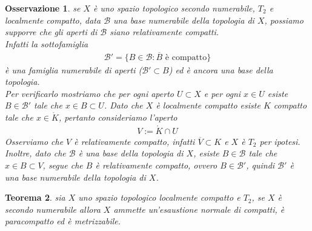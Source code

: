 \documentclass[oneside, 11pt]{amsbook}
\newcommand{\B}{\mathcal{B}}
\newcommand{\0}{{(0)}}
\newcommand{\3}{{(3)}}
\theoremstyle{colonplain}
\newtheorem{thm}{Teorema}[chapter]
\theoremstyle{colondefinition}
\theoremstyle{colonremark}
\newtheorem{rmk}[thm]{Osservazione}
\numberwithin{equation}{chapter}
\begin{document}
\begin{rmk}\label{RelCptBase}
    se $X$ è uno spazio topologico secondo numerabile, $T_2$ e localmente compatto, data $\B$ una base numerabile della topologia di $X$, possiamo supporre che gli aperti di $\B$ siano relativamente compatti. \\
    Infatti la sottofamiglia
    \begin{align}
        \B' = \{B \in \B : \overline{B} \text{ è compatto}\}
    \end{align}
    è una famiglia numerabile di aperti ($\B' \subset B$) ed è ancora una base della topologia. \\
    Per verificarlo mostriamo che per ogni aperto $U \subset X$ e per ogni $x \in U$ esiste $B \in \B'$ tale che $x \in B \subset U$. Dato che $X$ è localmente compatto esiste $K$ compatto tale che $x \in \mathring{K}$, pertanto consideriamo l'aperto
    \begin{align}
        V := \mathring{K} \cap U
    \end{align}
    Osserviamo che $V$ è relativamente compatto, infatti $\overline{V} \subset K$ e $X$ è $T_2$ per ipotesi. Inoltre, dato che $\B$ è una base della topologia di $X$, esiste $B \in \B$ tale che $x \in B \subset V$, segue che $B$ è relativamente compatto, ovvero $B \in \B'$, quindi $\B'$ è una base numerabile della topologia di $X$.
\end{rmk}
\begin{thm}\label{SecNumConsVTop}
    sia $X$ uno spazio topologico localmente compatto e $T_2$, se $X$ è secondo numerabile allora $X$ ammette un'esaustione normale di compatti, è paracompatto ed è metrizzabile.
\end{thm}
\end{document}
